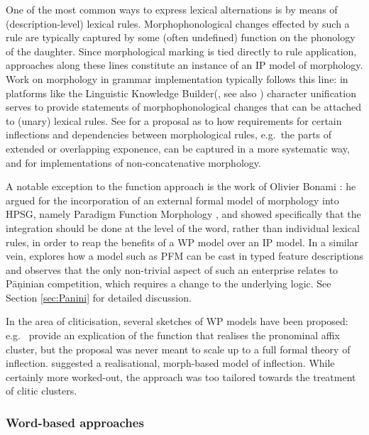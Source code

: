 \documentclass[output=paper,biblatex,babelshorthands,newtxmath,draftmode,colorlinks,citecolor=brown]{langscibook}
\begin{document}
One of the most common ways to express lexical alternations is by
means of (description-level) lexical rules. Morphophonological changes
effected by such a rule are typically captured by some (often
undefined) function on the phonology of the daughter. Since
morphological marking is tied directly to rule application, approaches
along these lines constitute an instance of an IP model of
morphology. Work on morphology in grammar implementation typically
follows this line: in platforms like the Linguistic Knowledge
Builder\indexlkb  (\citealp[LKB;][]{Copestake02}, see also \crossrefchapteralp[\page \pageref{cl:delphin}]{cl})
character unification serves to provide statements of
morphophonological changes that can be attached to (unary) lexical
rules. See \citet{Goodman10} for a proposal as to how requirements for
certain inflections and dependencies
between morphological rules, e.g.\ the parts of extended or overlapping
exponence, can be captured in a more systematic way,
and \citet{Crysmann:15:JLM,Crysmann:2017:JOMO} for implementations of
non-concatenative morphology. 


A notable exception to the function approach is the work of Olivier
Bonami \citep{bonami2015diversity,Bonami14d}: he argued for the incorporation of an
external formal model of morphology into HPSG, namely Paradigm Function
Morphology  \citep[=PFM;][]{Stump01}, and
showed specifically that the integration should be done at the level
of the word, rather than individual lexical rules, in order to reap
the benefits of a WP model over an IP model. In a similar vein,
\citet{Erjavec94} explores how a model such as PFM can be cast in
typed feature descriptions and observes that the only non-trivial
aspect of such an enterprise relates to Pāṇinian competition, which
requires a change to the underlying logic. See Section
\ref{sec:Panini} for detailed discussion.

In the area of cliticisation, several sketches of WP models have been
proposed: e.g.\ \citet{Miller97} provide an explication of the function
that realises the pronominal affix cluster, but the proposal was never
meant to scale up to a full formal theory of
inflection. \citet{crysmann_b03book} suggested a realisational,
morph-based model of inflection. While certainly more worked-out, the
approach was too tailored towards the treatment of clitic
clusters. 



\subsubsection*{Word-based approaches}
\end{document}
